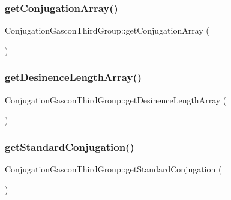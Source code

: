 \hypertarget{class_conjugation_gascon_third_group_ab98edff3803ea21806d84b55e99b58fb}{}\label{class_conjugation_gascon_third_group_ab98edff3803ea21806d84b55e99b58fb} 
\subsubsection{\texorpdfstring{get\+Conjugation\+Array()}{getConjugationArray()}}
{\footnotesize\ttfamily Conjugation\+Gascon\+Third\+Group\+::get\+Conjugation\+Array (\begin{DoxyParamCaption}{ }\end{DoxyParamCaption})\hspace{0.3cm}{\ttfamily [protected]}}

\hypertarget{class_conjugation_gascon_third_group_aca29f03d35cb95b12858698faf6d9a55}{}\label{class_conjugation_gascon_third_group_aca29f03d35cb95b12858698faf6d9a55} 
\subsubsection{\texorpdfstring{get\+Desinence\+Length\+Array()}{getDesinenceLengthArray()}}
{\footnotesize\ttfamily Conjugation\+Gascon\+Third\+Group\+::get\+Desinence\+Length\+Array (\begin{DoxyParamCaption}{ }\end{DoxyParamCaption})\hspace{0.3cm}{\ttfamily [protected]}}

\hypertarget{class_conjugation_gascon_third_group_a5b658699da2a8e2c53406668483816be}{}\label{class_conjugation_gascon_third_group_a5b658699da2a8e2c53406668483816be} 
\subsubsection{\texorpdfstring{get\+Standard\+Conjugation()}{getStandardConjugation()}}
{\footnotesize\ttfamily Conjugation\+Gascon\+Third\+Group\+::get\+Standard\+Conjugation (\begin{DoxyParamCaption}{ }\end{DoxyParamCaption})\hspace{0.3cm}{\ttfamily [protected]}}

